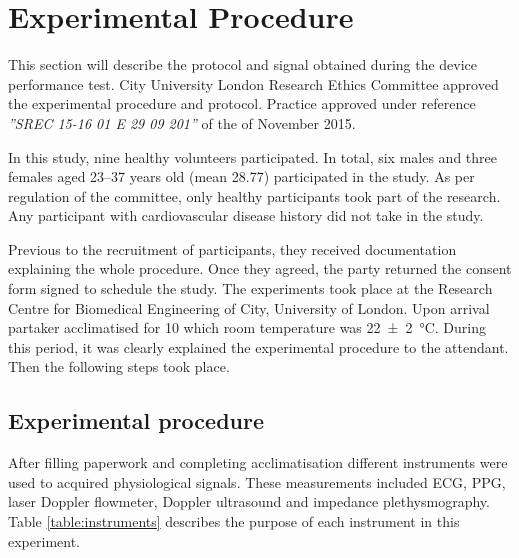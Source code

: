
\chapter{Experimental Procedure}  %
\label{chapter procedure}

\ifpdf
    \graphicspath{{Chapter5/Figs/Raster/}{Chapter5/Figs/PDF/}{Chapter5/Figs/}}
\else
    \graphicspath{{Chapter5/Figs/Vector/}{Chapter5/Figs/}}
\fi

This section will describe the protocol and signal obtained during the device performance test. City University London Research Ethics Committee approved the experimental procedure and protocol. Practice approved under reference \textit{''SREC 15-16 01 E 29 09 201''} of the  of November 2015. 

In this study, nine healthy volunteers participated. In total, six males and three females aged \numrange{23}{37} years old (mean 28.77) participated in the study. As per regulation of the committee, only healthy participants took part of the research. Any participant with cardiovascular disease history did not take in the study. 

Previous to the recruitment of participants, they received documentation explaining the whole procedure. Once they agreed, the party returned the consent form signed to schedule the study. The experiments took place at the Research Centre for Biomedical Engineering of City, University of London. Upon arrival partaker acclimatised for \SI{10}{\min} which room temperature was \SI{22(2)}{\degreeCelsius}. During this period, it was clearly explained the experimental procedure to the attendant. Then the following steps took place.


\section{Experimental procedure} %
\label{section procedure 1}

After filling paperwork and completing acclimatisation different instruments were used to acquired physiological signals. These measurements included ECG, PPG, laser Doppler flowmeter, Doppler ultrasound and impedance plethysmography. Table \ref{table:instruments} describes the purpose of each instrument in this experiment. 

